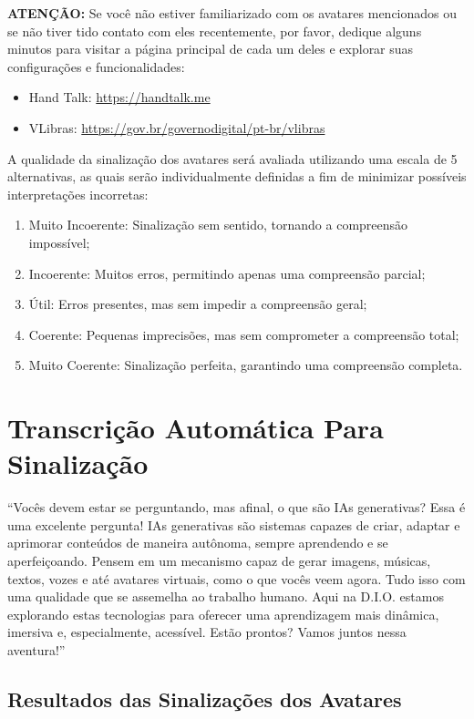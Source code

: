 \noindent
\textbf{ATENÇÃO:} Se você não estiver familiarizado com os avatares mencionados ou se não 
tiver tido contato com eles recentemente, por favor, dedique alguns minutos para visitar a 
página principal de cada um deles e explorar suas configurações e funcionalidades:

\begin{itemize}
    \item Hand Talk: \url{https://handtalk.me}
    \item VLibras: \url{https://gov.br/governodigital/pt-br/vlibras}
\end{itemize}

\noindent
A qualidade da sinalização dos avatares será avaliada utilizando uma escala de 5 
alternativas, as quais serão individualmente definidas a fim de minimizar possíveis 
interpretações incorretas:

\begin{enumerate}
    \item Muito Incoerente: Sinalização sem sentido, tornando a compreensão impossível;
    \item Incoerente: Muitos erros, permitindo apenas uma compreensão parcial;
    \item Útil: Erros presentes, mas sem impedir a compreensão geral;
    \item Coerente: Pequenas imprecisões, mas sem comprometer a compreensão total;
    \item Muito Coerente: Sinalização perfeita, garantindo uma compreensão completa.
\end{enumerate}

\section{Transcrição Automática Para Sinalização}

\noindent
``Vocês devem estar se perguntando, mas afinal, o que são IAs generativas? Essa é uma 
excelente pergunta!
IAs generativas são sistemas capazes de criar, adaptar e aprimorar conteúdos de maneira 
autônoma, sempre aprendendo e se aperfeiçoando.
Pensem em um mecanismo capaz de gerar imagens, músicas, textos, vozes e até avatares 
virtuais, como o que vocês veem agora. Tudo isso com uma qualidade que se assemelha ao 
trabalho humano.
Aqui na D.I.O. estamos explorando estas tecnologias para oferecer uma aprendizagem mais 
dinâmica, imersiva e, especialmente, acessível.
Estão prontos? Vamos juntos nessa aventura!''

\subsection*{Resultados das Sinalizações dos Avatares}

